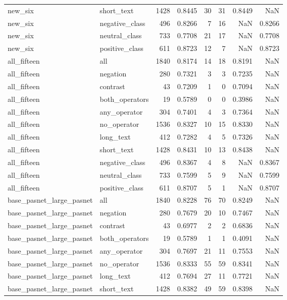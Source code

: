 \begin{tabular}{llrrrrrr}
new\_six & short\_text & 1428 & 0.8445 & 30 & 31 & 0.8449 & NaN \\
new\_six & negative\_class & 496 & 0.8266 & 7 & 16 & NaN & 0.8266 \\
new\_six & neutral\_class & 733 & 0.7708 & 21 & 17 & NaN & 0.7708 \\
new\_six & positive\_class & 611 & 0.8723 & 12 & 7 & NaN & 0.8723 \\
all\_fifteen & all & 1840 & 0.8174 & 14 & 18 & 0.8191 & NaN \\
all\_fifteen & negation & 280 & 0.7321 & 3 & 3 & 0.7235 & NaN \\
all\_fifteen & contrast & 43 & 0.7209 & 1 & 0 & 0.7094 & NaN \\
all\_fifteen & both\_operators & 19 & 0.5789 & 0 & 0 & 0.3986 & NaN \\
all\_fifteen & any\_operator & 304 & 0.7401 & 4 & 3 & 0.7364 & NaN \\
all\_fifteen & no\_operator & 1536 & 0.8327 & 10 & 15 & 0.8330 & NaN \\
all\_fifteen & long\_text & 412 & 0.7282 & 4 & 5 & 0.7326 & NaN \\
all\_fifteen & short\_text & 1428 & 0.8431 & 10 & 13 & 0.8438 & NaN \\
all\_fifteen & negative\_class & 496 & 0.8367 & 4 & 8 & NaN & 0.8367 \\
all\_fifteen & neutral\_class & 733 & 0.7599 & 5 & 9 & NaN & 0.7599 \\
all\_fifteen & positive\_class & 611 & 0.8707 & 5 & 1 & NaN & 0.8707 \\
base\_pasnet\_large\_pasnet & all & 1840 & 0.8228 & 76 & 70 & 0.8249 & NaN \\
base\_pasnet\_large\_pasnet & negation & 280 & 0.7679 & 20 & 10 & 0.7467 & NaN \\
base\_pasnet\_large\_pasnet & contrast & 43 & 0.6977 & 2 & 2 & 0.6836 & NaN \\
base\_pasnet\_large\_pasnet & both\_operators & 19 & 0.5789 & 1 & 1 & 0.4091 & NaN \\
base\_pasnet\_large\_pasnet & any\_operator & 304 & 0.7697 & 21 & 11 & 0.7553 & NaN \\
base\_pasnet\_large\_pasnet & no\_operator & 1536 & 0.8333 & 55 & 59 & 0.8341 & NaN \\
base\_pasnet\_large\_pasnet & long\_text & 412 & 0.7694 & 27 & 11 & 0.7721 & NaN \\
base\_pasnet\_large\_pasnet & short\_text & 1428 & 0.8382 & 49 & 59 & 0.8398 & NaN \\

\end{tabular}
